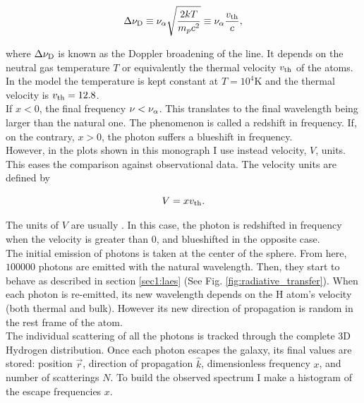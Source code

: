 \begin{equation}
\label{eq:delta_nuD}
\Delta\nu_{\rm D} \equiv \nu_{\rm \alpha}\sqrt{\frac{2kT}{m_pc^2}} \equiv \nu_{\rm \alpha} \frac{v_{\rm th}}{c},
\end{equation} 

where $\Delta\nu_{\rm D}$ is known as the Doppler broadening of the \lya line. It depends on the neutral gas temperature $T$ or equivalently the thermal velocity $v_{\rm th}$ of the atoms. In the model the temperature is kept constant at $T=10^4$K and the thermal velocity is $v_{\rm th}=12.8$\kms. \\

If $x < 0$, the final frequency $\nu < \nu_{\rm \alpha}$. This translates to the final wavelength being larger than the \lya natural one. The phenomenon is called a redshift in frequency. If, on the contrary, $x > 0$, the photon suffers a blueshift in frequency. \\

However, in the plots shown in this monograph I use instead velocity, $V$, units. This eases the comparison against observational data. The velocity units are defined by

\begin{equation}
\label{eq:V}
V = xv_{\rm th}.
\end{equation}

The units of $V$ are usually \kms. In this case, the photon is redshifted in frequency when the velocity is greater than 0, and blueshifted in the opposite case. \\

The initial emission of photons is taken at the center of the sphere. From here, $100000$ photons are emitted with the natural \lya wavelength. Then, they start to behave as described in section \ref{sec1:laes} (See Fig. \ref{fig:radiative_transfer}). When each photon is re-emitted, its new wavelength depends on the H atom's velocity (both thermal and bulk). However its new direction of propagation is random in the rest frame of the atom. \\ 

The individual scattering of all the photons is tracked through the complete 3D Hydrogen distribution. Once each photon escapes the galaxy, its final values are stored: position $\vec{r}$, direction of propagation $\hat{k}$, dimensionless frequency $x$, and number of scatterings $N$. To build the observed spectrum I make a histogram of the escape frequencies $x$.\\


